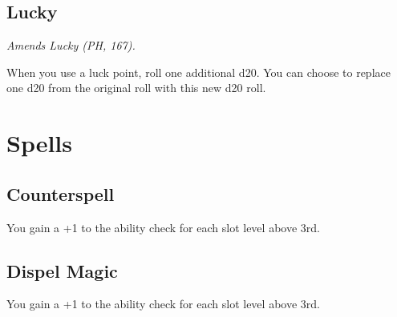 \documentclass[House_Rules.tex]{subfiles}
\begin{document}
\subsection{Lucky}
\textit{Amends Lucky (PH, 167).}

When you use a luck point, roll one additional d20. You can choose to replace one d20 from the original roll with this new d20 roll.




\section{Spells}

\subsection{Counterspell}
You gain a +1 to the ability check for each slot level above 3rd.


\subsection{Dispel Magic}
You gain a +1 to the ability check for each slot level above 3rd.
\end{document}
